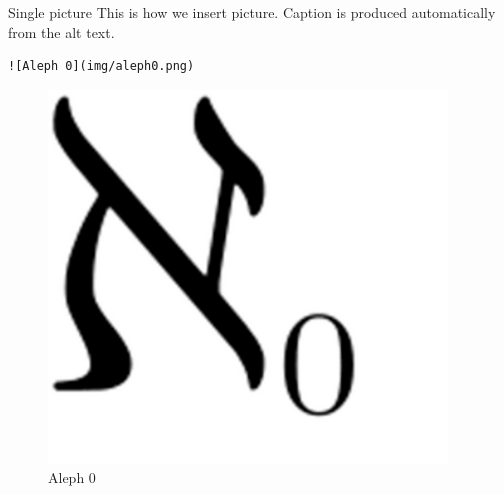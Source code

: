 \documentclass[
  11pt,
  ignorenonframetext,
  aspectratio=169,
  aspectratio=169]{beamer}
\begin{document}
\begin{frame}[fragile]{Single picture}
\protect\hypertarget{single-picture}{}
This is how we insert picture. Caption is produced automatically from
the alt text.

\begin{lstlisting}
![Aleph 0](img/aleph0.png) 
\end{lstlisting}

\begin{figure}
\centering
\includegraphics{img/aleph0.png}
\caption{Aleph 0}
\end{figure}
\end{frame}
\end{document}
